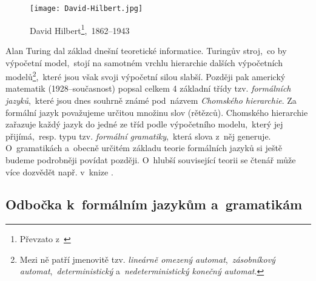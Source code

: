 \begin{figure}[h]
    \centering
    \texttt{[image: David-Hilbert.jpg]}
    \caption[David Hilbert,~1862--1943]{David Hilbert\footnote{Převzato z~\cite{OConnorHilbert2025}},~1862--1943}
    \label{fig:david-hilbert}
\end{figure}
Alan Turing dal základ dnešní teoretické informatice. Turingův stroj,~co by výpočetní model,~stojí na samotném vrchlu hierarchie dalších výpočetních modelů\footnote{Mezi ně patří jmenovitě tzv. \textit{lineárně omezený automat},~\emph{zásobníkový automat},~\emph{deterministický} a~\emph{nedeterministický konečný automat}.},~které jsou však svoji výpočetní silou slabší.  Později pak americký matematik  (1928--současnost) popsal celkem 4 základní třídy tzv. \emph{formálních jazyků},~které jsou dnes souhrně známé pod~názvem \emph{Chomského hierarchie}. Za formální jazyk považujeme určitou množinu slov (rětězců). Chomského hierarchie zařazuje každý jazyk do jedné ze tříd podle výpočetního modelu,~který jej přijímá,~resp. typu tzv. \emph{formální gramatiky},~která slova z~něj generuje. O~gramatikách a~obecně určitém základu teorie formálních jazyků si ještě budeme podrobněji povídat později. O~hlubší související teorii se čtenář může více dozvědět např. v~knize \cite{Motwani2003}.

\subsection{Odbočka k~formálním jazykům a~gramatikám}\label{subsec:formalni-jazyky-a-gramatiky}

